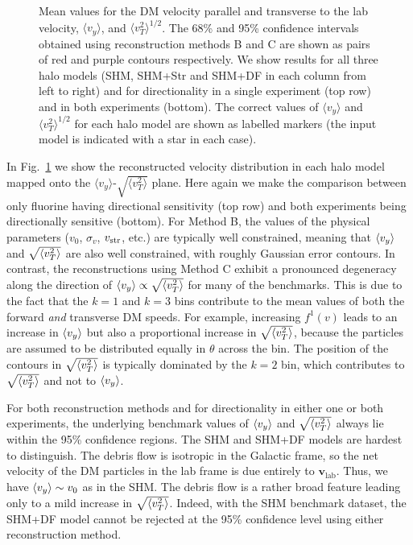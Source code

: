 \begin{figure}
    \caption[Reconstructed parallel and transverse velocities for each halo model]{Mean values for the DM velocity parallel and transverse to the lab velocity, $\langle v_y \rangle$, and $\langle v_T^2 \rangle^{1/2}$. The 68\% and 95\% confidence intervals obtained using reconstruction methods B and C are shown as pairs of red and purple contours respectively. We show results for all three halo models (SHM, SHM+Str and SHM+DF in each column from left to right) and for directionality in a single experiment (top row) and in both experiments (bottom). The correct values of $\langle v_y \rangle$ and $\langle v_T^2 \rangle^{1/2}$ for each halo model are shown as labelled markers (the input model is indicated with a star in each case).}\label{fig:vyvT}
\end{figure}
In Fig.~\ref{fig:vyvT} we show the reconstructed velocity distribution in each halo model mapped onto the $\langle v_y \rangle$-$\sqrt{\langle v_T^2 \rangle}$ plane. Here again we make the comparison between only fluorine having directional sensitivity (top row) and both experiments being directionally sensitive (bottom). For Method B, the values of the physical parameters ($v_0$, $\sigma_v$, $v_{\rm str}$, etc.) are typically well constrained, meaning that $\langle v_y \rangle$ and $\sqrt{\langle v_T^2 \rangle}$ are also well constrained, with roughly Gaussian error contours.  In contrast, the reconstructions using Method C exhibit a pronounced degeneracy along the direction of $\langle v_y \rangle \propto \sqrt{\langle v_T^2 \rangle}$ for many of the benchmarks. This is due to the fact that the $k=1$ and $k=3$ bins contribute to the mean values of both the forward \textit{and} transverse DM speeds. For example, increasing $f^1(v)$ leads to an increase in $\langle v_y \rangle$ but also a proportional increase in $\sqrt{\langle v_T^2 \rangle}$, because the particles are assumed to be distributed equally in $\theta$ across the bin. The position of the contours in $\sqrt{\langle v_T^2 \rangle}$ is typically dominated by the $k=2$ bin, which contributes to $\sqrt{\langle v_T^2 \rangle}$ and not to $\langle v_y \rangle$. 

For both reconstruction methods and for directionality in either one or both experiments, the underlying benchmark values of $\langle v_y \rangle$ and $\sqrt{\langle v_T^2 \rangle}$ always lie within the 95\% confidence regions. The SHM and SHM+DF models are hardest to distinguish. The debris flow is isotropic in the Galactic frame, so the net velocity of the DM particles in the lab frame is due entirely to $\textbf{v}_\textrm{lab}$. Thus, we have $\langle v_y \rangle \sim v_0$ as in the SHM. The debris flow is a rather broad feature leading only to a mild increase in $\sqrt{\langle v_T^2 \rangle}$. Indeed, with the SHM benchmark dataset, the SHM+DF model cannot be rejected at the 95\% confidence level using either reconstruction method.  

